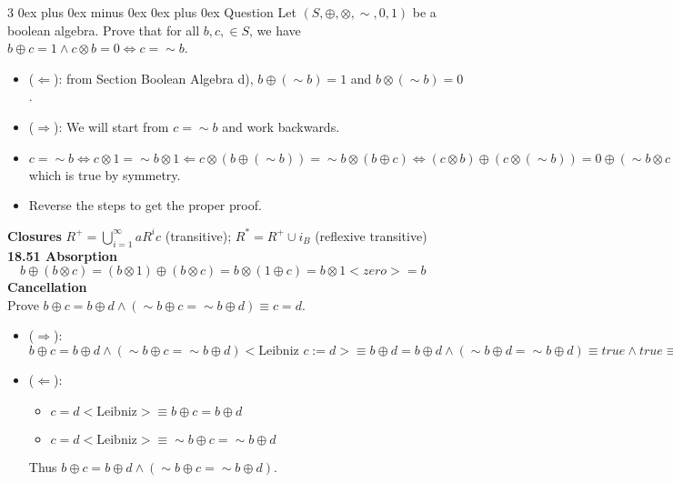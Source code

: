 \documentclass[letterpaper, 8pt]{extarticle}
\makeatletter
\renewcommand{\subsubsection}{\@startsection{subsubsection}{3}{0mm}%
                                {0ex plus 0ex minus 0ex}%
                                {0ex plus 0ex}%
                                {\normalfont\tiny\bfseries}}
\makeatother
\begin{document}
\begin{multicols*}{3}
    \subsubsection{Question }
    Let $(S, \oplus, \otimes, \sim, 0, 1)$ be a boolean algebra. Prove that for all $b, c, \in S$, we have $b \oplus c = 1 \land c \otimes b = 0 \Leftrightarrow c = \sim b$.
    \begin{itemize}
        \item
            ($\Leftarrow$): from Section Boolean Algebra d), $b \oplus (\sim b) = 1$ and $b \otimes (\sim b) = 0$.
        \item
            ($\Rightarrow$): We will start from $c = \sim b$ and work backwards.
        \item
            $c = \sim b \Leftrightarrow c \otimes 1= \sim b \otimes 1 \Leftarrow c \otimes (b \oplus (\sim b)) = \sim b \otimes (b \oplus c) \Leftrightarrow (c \otimes b) \oplus (c \otimes (\sim b)) = 0 \oplus (\sim b \otimes c) \Leftrightarrow c \otimes (\sim b) = (\sim b) \otimes c$ which is true by symmetry.
        \item
            Reverse the steps to get the proper proof.
    \end{itemize}

    \textbf{Closures}
    $R^+=\bigcup_{i=1}^\infty a R^i c$ (transitive); $R^* = R^+ \cup i_B$ (reflexive transitive) \\

    \textbf{18.51 Absorption} \\
    $\quad b \oplus (b \otimes c) = (b \otimes 1) \oplus (b \otimes c) = b \otimes (1 \oplus c) = b \otimes 1 <zero> = b$ \\

    \textbf{Cancellation} \\
    Prove $b \oplus c = b \oplus d \land (\sim b \oplus c = \sim b \oplus d) \equiv c = d$.
    \begin{itemize}
        \item
            ($\Rightarrow$): $b \oplus c = b \oplus d \land (\sim b \oplus c = \sim b \oplus d) <\text{Leibniz } c:=d> \equiv b \oplus d = b \oplus d \land (\sim b \oplus d = \sim b \oplus d) \equiv true \land true \equiv true$
        \item
            ($\Leftarrow$):
            \begin{itemize}
                \item
                    $c = d <\text{Leibniz}> \equiv b \oplus c = b \oplus d$
                \item
                    $c = d <\text{Leibniz}> \equiv \sim b \oplus c = \sim b \oplus d$
            \end{itemize}
            Thus $b \oplus c = b \oplus d \land (\sim b \oplus c = \sim b \oplus d)$.
    \end{itemize}

\end{multicols*}
\end{document}

